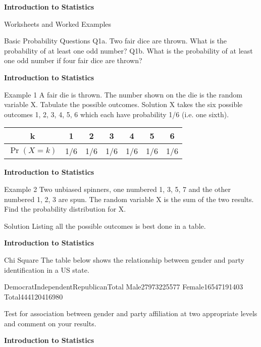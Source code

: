 \documentclass[]{report}
\begin{document}

\textbf{Introduction to Statistics}

Worksheets and Worked Examples


Basic Probability Questions
Q1a.  Two fair dice are thrown. What is the probability of at least one odd number? 
Q1b.  What is the probability of at least one odd number if four fair dice are thrown?


\textbf{Introduction to Statistics}


Example 1 
A fair die is thrown. The number shown on the die is the random variable X. Tabulate the possible outcomes. 
Solution 
X takes the six possible outcomes 1, 2, 3, 4, 5, 6 which each have probability 1/6 (i.e. one sixth). 
\begin{tabular}{|c|c|c|c|c|c|c|}
\hline k & 1 & 2 & 3 & 4 & 5 & 6 \\ 
\hline $\Pr( X=k)$ & 1/6 & 1/6 & 1/6 & 1/6 & 1/6 & 1/6 \\ 
\hline 
\end{tabular} 


\textbf{Introduction to Statistics}

Example 2 
Two unbiased spinners, one numbered 1, 3, 5, 7 and the other numbered 1, 2, 3 are spun. The random variable X is the sum of the two results. 
Find the probability distribution for X.



Solution 
Listing all the possible outcomes is best done in a table. 





\textbf{Introduction to Statistics}


Chi Square
The table below shows the relationship between gender and party identification in a US state.


DemocratIndependentRepublicanTotal
Male27973225577
Female16547191403
Total444120416980

Test for association between gender and party affiliation at two appropriate levels
and comment on your results.


\textbf{Introduction to Statistics}
\end{document}
